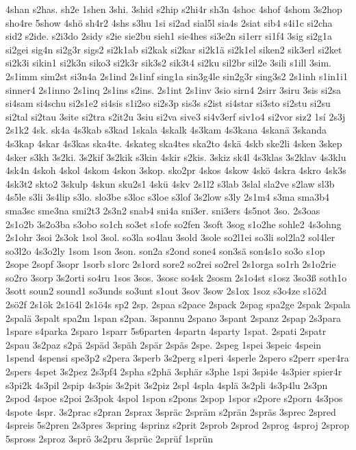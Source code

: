 {4shan
s2has.
sh2e
1shen
3shi.
3shid
s2hip
s2hi4r
sh3n
4shoc
4shof
4shom
3s2hop
sho4re
5show
4shö
sh4r2
4shs
s3hu
1si
si2ad
sial5l
sia4s
2siat
sib4
s4i1c
si2cha
sid2
s2ide.
s2i3do
2sidy
s2ie
sie2bu
sieh1
sie4hes
si3e2n
si1err
si1f4
3sig
si2g1a
si2gei
sig4n
si2g3r
sigs2
si2k1ab
si2kak
si2kar
si2k1ä
si2k1el
siken2
sik3erl
si2ket
si2k3i
sikin1
si2k3n
siko3
si2k3r
sik3s2
sik3t4
si2ku
sil2br
sil2e
3sili
s1ill
3sim.
2s1imm
sim2st
si3n4a
2s1ind
2s1inf
sing1a
sin3g4le
sin2g3r
sing3s2
2s1inh
s1in1i1
sinner4
2s1inno
2s1inq
2s1ins
s2ins.
2s1int
2s1inv
3sio
sirn4
2sirr
3siru
3sis
si2sa
si4sam
si4schu
si2s1e2
si4sis
s1i2so
si2s3p
sis3s
s2ist
si4star
si3sto
si2stu
si2su
si2tal
si2tau
3site
si2tra
s2it2u
3siu
si2va
sive3
si4v3erf
siv1o4
si2vor
siz2
1sí
2s3j
2s1k2
4sk.
sk4a
4s3kab
s3kad
1skala
4skalk
4s3kam
4s3kana
4skanä
3skanda
4s3kap
4skar
4s3kas
ska4te.
4skateg
ska4tes
ska2to
4skä
4skb
ske2li
4sken
3skep
4sker
s3kh
3s2ki.
3s2kif
3s2kik
s3kin
4skir
s2kis.
3skiz
sk4l
4s3klas
3s2klav
4s3klu
4sk4n
4skoh
4skol
4skom
4skon
3skop.
sko2pr
4skos
4skow
4skö
4skra
4skro
4sk3s
4sk3t2
skto2
3skulp
4skun
sku2s1
4skü
4skv
2s1l2
s3lab
3slal
sla2ve
s2law
sl3b
4s5le
s3li
3s4lip
s3lo.
slo3be
s3loc
s3loe
s3lof
3s2low
s3ly
2s1m4
s3ma
sma3b4
sma3sc
sme3na
smi2t3
2s3n2
snab4
sni4a
sni3er.
sni3ers
4s5not
3so.
2s3oas
2s1o2b
3s2o3ba
s3obo
so1ch
so3et
s1ofe
so2fen
3soft
3sog
s1o2he
sohle2
4s3ohng
2s1ohr
3soi
2s3ok
1sol
3sol.
so3la
so4lau
3sold
3sole
so2l1ei
so3li
sol2la2
sol4ler
so3l2o
4s3o2ly
1som
1son
3son.
son2a
s2ond
sone4
son3sä
son4s1o
so3o
s1op
2sope
2sopf
3sopr
1sorb
s1orc
2s1ord
sore2
so2rei
so2rel
2s1orga
so1rh
2s1o2rie
so2ro
3sorp
3s2orti
so4ru
1sos
3sos.
3sosc
so4sk
2sosm
2s1o4st
s1osz
3so3ß
soth1o
3sott
soun2
sound1
so3unds
so3unt
s1out
3sov
3sow
2s1ox
1soz
s3o4ze
s1ö2d
2sö2f
2s1ök
2s1ö4l
2s1ö4s
sp2
2sp.
2spaa
s2pace
2spack
2spag
spa2ge
2spak
2spala
2spalä
3spalt
spa2m
1span
s2pan.
3spannu
2spano
3spant
2spanz
2spap
2s3para
1spare
s4parka
2sparo
1sparr
5s6parten
4spartn
4sparty
1spat.
2spati
2spatr
2spau
3s2paz
s2pä
2späd
3späh
2spär
2späs
2spe.
2speg
1spei
3speic
4spein
1spend
4spensi
spe3p2
s2pera
3sperb
3s2perg
s1peri
4sperle
2spero
s2perr
sper4ra
2spers
4spet
3s2pez
2s3pf4
2spha
s2phä
3sphär
s3phe
1spi
3spi4e
4s3pier
spier4r
s3pi2k
4s3pil
2spip
4s3pis
3s2pit
3s2piz
2spl
4spla
4splä
3s2pli
4s3p4lu
2s3pn
2spod
4spoe
s2poi
2s3pok
4spol
1spon
s2pons
2spop
1spor
s2pore
s2porn
4s3pos
4spote
4spr.
3s2prac
s2pran
2sprax
3spräc
2spräm
s2prän
2spräs
3sprec
2spred
4spreis
5s2pren
2s3pres
3spring
4sprinz
s2prit
2sprob
2sprod
2sprog
4sproj
2sprop
5spross
2sproz
3sprö
3s2pru
3sprüc
2sprüf
1sprün
}
